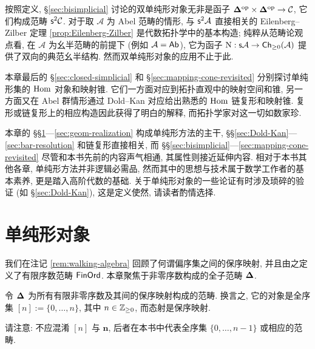 按照定义, \S\ref{sec:bisimplicial} 讨论的双单纯形对象无非是函子 $\bm\Delta^{\operatorname{op}} \times \bm\Delta^{\operatorname{op}} \to \mathcal{C}$, 它们构成范畴 $\mathsf{s}^2 \mathcal{C}$. 对于取 $\mathcal{A}$ 为 Abel 范畴的情形, 与 $\mathsf{s}^2 \mathcal{A}$ 直接相关的 Eilenberg--Zilber 定理 \ref{prop:Eilenberg-Zilber} 是代数拓扑学中的基本构造; 纯粹从范畴论观点看, 在 $\mathcal{A}$ 为幺半范畴的前提下 (例如 $\mathcal{A} = \mathsf{Ab}$), 它为函子 $\mathrm{N}: \mathsf{s}\mathcal{A} \to \mathsf{Ch}_{\geq 0}(\mathcal{A})$ 提供了双向的典范幺半结构. 然而双单纯形对象的应用不止于此.

本章最后的 \S\ref{sec:closed-simplicial} 和 \S\ref{sec:mapping-cone-revisited} 分别探讨单纯形集的 $\operatorname{Hom}$ 对象和映射锥. 它们一方面对应到拓扑直观中的映射空间和锥, 另一方面又在 Abel 群情形通过 Dold--Kan 对应给出熟悉的 $\operatorname{Hom}$ 链复形和映射锥. 复形或链复形上的相应构造因此获得了明白的解释, 而拓扑学家对这一切如数家珍.

\begin{wenxintishi}
	本章的 \S\S\ref{sec:simplicial-method}---\ref{sec:geom-realization} 构成单纯形方法的主干, \S\S\ref{sec:Dold-Kan}---\ref{sec:bar-resolution} 和链复形直接相关, 而 \S\S\ref{sec:bisimplicial}---\ref{sec:mapping-cone-revisited} 尽管和本书先前的内容声气相通, 其属性则接近延伸内容. 相对于本书其他各章, 单纯形方法并非逻辑必需品, 然而其中的思想与技术属于数学工作者的基本素养, 更是踏入高阶代数的基础. 关于单纯形对象的一些论证有时涉及琐碎的验证 (如 \S\ref{sec:Dold-Kan}), 这是定义使然, 请读者酌情选择.
\end{wenxintishi}

\section{单纯形对象}\label{sec:simplicial-method}
我们在注记 \ref{rem:walking-algebra} 回顾了何谓偏序集之间的保序映射, 并且由之定义了有限序数范畴 $\mathsf{FinOrd}$. 本章聚焦于非零序数构成的全子范畴 $\bm\Delta$.

\begin{definition}
	\index[sym1]{[n]}
	令 $\bm\Delta$ 为所有有限非零序数及其间的保序映射构成的范畴. 换言之, 它的对象是全序集 $[n] := \{0, \ldots, n \}$, 其中 $n \in \mathbb{Z}_{\geq 0}$, 而态射是保序映射.
\end{definition}

请注意: 不应混淆 $[n]$ 与 $\mathbf{n}$, 后者在本书中代表全序集 $\{0, \ldots, n-1 \}$ 或相应的范畴.

